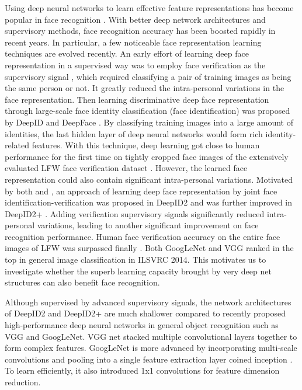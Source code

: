 \documentclass[10pt,twocolumn,letterpaper]{article}
\begin{document}
Using deep neural networks to learn effective feature representations has become popular in face recognition \cite{sun2013b,zhu2013,taigman2014a,zhu2014a,sun2014a,sun2014b,taigman2014b,zhu2014b,yi2014,sun2014c}. With better deep network architectures and supervisory methods, face recognition accuracy has been boosted rapidly in recent years. In particular, a few noticeable face representation learning techniques are evolved recently.
An early effort of learning deep face representation in a supervised way was to employ  face verification as the supervisory signal \cite{sun2013b}, which required classifying a pair of training images as being the same person or not. It greatly reduced the intra-personal variations in the face representation.
Then learning discriminative deep face representation through large-scale face identity classification (face identification) was proposed by DeepID \cite{sun2014a} and DeepFace \cite{taigman2014a,taigman2014b}. By classifying training images into a large amount of identities, the last hidden layer of deep neural networks would form rich identity-related features. With this technique, deep learning got close to human performance for the first time on tightly cropped face images of the extensively evaluated LFW face verification dataset \cite{huang2007a}. However, the learned face representation could also contain significant intra-personal variations.
Motivated by both \cite{sun2013b} and \cite{sun2014a}, an approach of learning deep face representation by joint face identification-verification was proposed in DeepID2 \cite{sun2014b} and was further improved in DeepID2+ \cite{sun2014c}. Adding verification supervisory signals significantly reduced intra-personal variations, leading to another significant improvement on face recognition performance. Human face verification accuracy on the entire face images of LFW was surpassed finally \cite{sun2014b,sun2014c}. Both GoogLeNet \cite{szegedy2014} and VGG \cite{simonyan2014} ranked in the top in general image classification in ILSVRC 2014. This motivates us to investigate whether the superb learning capacity brought by very deep net structures can also benefit face recognition.

Although supervised by advanced supervisory signals, the network architectures of DeepID2 and DeepID2+ are much shallower compared to recently proposed high-performance deep neural networks in general object recognition such as VGG and GoogLeNet. VGG net stacked multiple convolutional layers together to form complex features. GoogLeNet is more advanced by incorporating multi-scale convolutions and pooling into a single feature extraction layer coined inception \cite{szegedy2014}. To learn efficiently, it also introduced 1x1 convolutions for feature dimension reduction.
\end{document}

